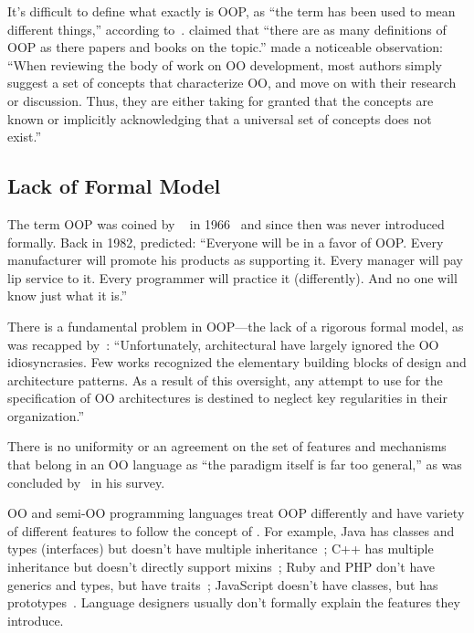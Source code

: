 It's difficult to define what exactly is OOP, as
``the term has been used to mean different things,'' according to~\citet{stefik1985object}.
\citet{madsen1988object} claimed that ``there are as many
definitions of OOP as there papers and books on the topic.''
\citet{armstrong2006quarks} made a noticeable observation: ``When
reviewing the body of work on OO development, most authors simply suggest a set
of concepts that characterize OO, and move on with their research or discussion.
Thus, they are either taking for granted that the concepts are known or implicitly
acknowledging that a universal set of concepts does not exist.''

\subsection{Lack of Formal Model}

The term OOP was coined by ~\citet{kay97keynote} in 1966~\cite{kaymaster68}
and since then was never introduced formally.
Back in 1982, \citet{rentsch1982object} predicted: ``Everyone will be in a favor
of OOP. Every manufacturer will promote his products as supporting it. Every
manager will pay lip service to it. Every programmer will practice
it (differently). And no one will know just what it is.''

There is a fundamental problem in OOP---the lack of a rigorous formal model,
as was recapped by~\citet{eden2001principles}: ``Unfortunately, architectural
 have largely ignored the OO idiosyncrasies. Few works recognized the
elementary building blocks of design and architecture patterns.
As a result of this oversight, any attempt to use  for the specification of OO
architectures is destined to neglect key regularities in their organization.''

There is no uniformity or an agreement on the set of features and mechanisms
that belong in an OO language as ``the paradigm itself is far too general,'' as was
concluded by~\citet{nierstrasz1989survey} in his survey.

OO and semi-OO programming languages treat OOP differently and have variety of
different features to follow the concept of . For
example, Java has classes and types (interfaces) but doesn't
have multiple inheritance~\citep{alpern2001efficient};
C++ has multiple inheritance but doesn't directly support mixins~\citep{burton2014using};
Ruby and PHP don't have generics and types, but have traits~\citep{bi2018typed};
JavaScript doesn't have classes, but has prototypes~\citep{richards2010analysis}.
Language designers usually don't formally explain the features they introduce.

